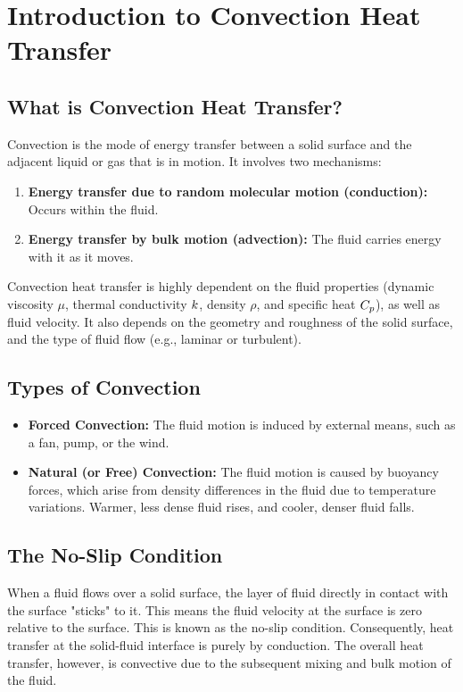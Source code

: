 \section{Introduction to Convection Heat Transfer}

\subsection{What is Convection Heat Transfer?}
Convection is the mode of energy transfer between a solid surface and the adjacent liquid or gas that is in motion. It involves two mechanisms:
\begin{enumerate}
    \item \textbf{Energy transfer due to random molecular motion (conduction):} Occurs within the fluid.
    \item \textbf{Energy transfer by bulk motion (advection):} The fluid carries energy with it as it moves.
\end{enumerate}
Convection heat transfer is highly dependent on the fluid properties (dynamic viscosity $\mu$, thermal conductivity $k$, density $\rho$, and specific heat $C_p$), as well as fluid velocity. It also depends on the geometry and roughness of the solid surface, and the type of fluid flow (e.g., laminar or turbulent).

\subsection{Types of Convection}
\begin{itemize}
    \item \textbf{Forced Convection:} The fluid motion is induced by external means, such as a fan, pump, or the wind.
    \item \textbf{Natural (or Free) Convection:} The fluid motion is caused by buoyancy forces, which arise from density differences in the fluid due to temperature variations. Warmer, less dense fluid rises, and cooler, denser fluid falls.
\end{itemize}

\subsection{The No-Slip Condition}
When a fluid flows over a solid surface, the layer of fluid directly in contact with the surface "sticks" to it. This means the fluid velocity at the surface is zero relative to the surface. This is known as the no-slip condition. Consequently, heat transfer at the solid-fluid interface is purely by conduction. The overall heat transfer, however, is convective due to the subsequent mixing and bulk motion of the fluid.

